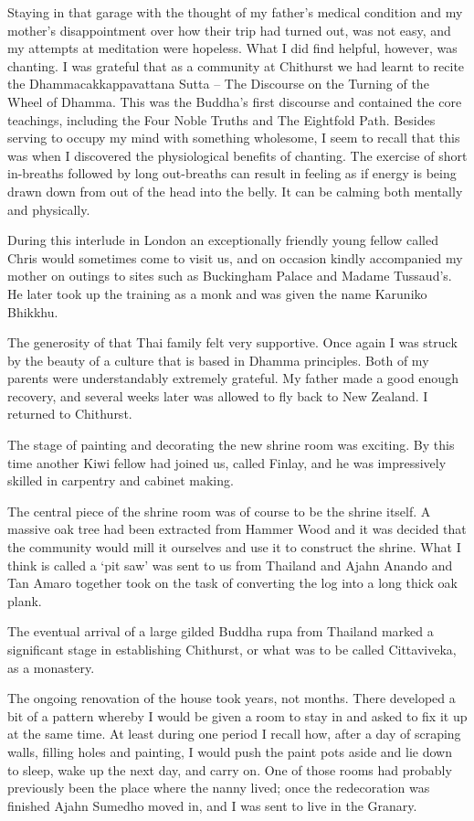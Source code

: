 Staying in that garage with the thought of my father's medical condition
and my mother's disappointment over how their trip had turned out, was
not easy, and my attempts at meditation were hopeless. What I did find
helpful, however, was chanting. I was grateful that as a community at
Chithurst we had learnt to recite the Dhammacakkappavattana Sutta
-- The Discourse on the Turning of the Wheel of Dhamma. This was the
Buddha's first discourse and contained the core teachings, including the
Four Noble Truths and The Eightfold Path. Besides serving to occupy my
mind with something wholesome, I seem to recall that this was when I
discovered the physiological benefits of chanting. The exercise of short
in-breaths followed by long out-breaths can result in feeling as if
energy is being drawn down from out of the head into the belly. It can
be calming both mentally and physically.

During this interlude in London an exceptionally friendly young fellow
called Chris would sometimes come to visit us, and on occasion kindly
accompanied my mother on outings to sites such as Buckingham Palace and
Madame Tussaud's. He later took up the training as a monk and was given
the name Karuniko Bhikkhu.

The generosity of that Thai family felt very supportive. Once again I
was struck by the beauty of a culture that is based in Dhamma
principles. Both of my parents were understandably extremely grateful.
My father made a good enough recovery, and several weeks later was
allowed to fly back to New Zealand. I returned to Chithurst.

The stage of painting and decorating the new shrine room was exciting.
By this time another Kiwi fellow had joined us, called Finlay, and he was
impressively skilled in carpentry and cabinet making.

The central piece of the shrine room was of course to be the shrine
itself. A massive oak tree had been extracted from Hammer Wood and it
was decided that the community would mill it ourselves and use it to
construct the shrine. What I think is called a `pit saw' was sent to us
from Thailand and Ajahn Anando and Tan Amaro together took on the task
of converting the log into a long thick oak plank.

The eventual arrival of a large gilded Buddha rupa from Thailand marked
a significant stage in establishing Chithurst, or what was to be called
Cittaviveka, as a monastery.

The ongoing renovation of the house took years, not months. There
developed a bit of a pattern whereby I would be given a room to stay in
and asked to fix it up at the same time. At least during one period I
recall how, after a day of scraping walls, filling holes and painting, I
would push the paint pots aside and lie down to sleep, wake up the next
day, and carry on. One of those rooms had probably previously been the
place where the nanny lived; once the redecoration was finished Ajahn Sumedho moved
in, and I was sent to live in the Granary.

